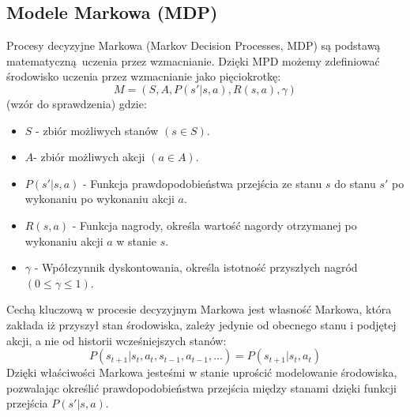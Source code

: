 \documentclass[a4paper, 10pt]{article}
\begin{document}
    \subsection{Modele Markowa (MDP)}
    Procesy decyzyjne Markowa (Markov Decision Processes, MDP) są podstawą matematyczną uczenia przez wzmacnianie. Dzięki MPD możemy zdefiniować
    środowisko uczenia przez wzmacnianie jako pięciokrotkę:
    \[ M = (S,A, P(s'|s,a), R(s,a), \gamma) \] (wzór do sprawdzenia)
    gdzie:
    \begin{itemize}
        \item \( S \)  - zbiór możliwych stanów \( (s \in S ) \).
        \item \( A \)- zbiór możliwych akcji \( (a \in A ) \).
        \item \( P(s'|s,a) \) - Funkcja prawdopodobieństwa przejścia ze stanu \( s \) do stanu \( s' \) po wykonaniu po wykonaniu akcji \( a \).
        \item \( R(s,a) \) - Funkcja nagrody, określa wartość nagordy otrzymanej po wykonaniu akcji \( a \) w stanie \( s \).
        \item \( \gamma \) - Wpółczynnik dyskontowania, określa istotność przyszłych nagród \( (0 \leq \gamma \leq 1) \).
    \end{itemize}
    Cechą kluczową w procesie decyzyjnym Markowa jest własność Markowa, która zakłada iż przyszył stan środowiska, zależy jedynie od obecnego
    stanu i podjętej akcji, a nie od historii wcześniejszych stanów:
    \[ P(s_{t+1}|s_t,a_t,s_{t-1},a_{t-1},...) = P(s_{t+1}|s_t, a_t) \]
    Dzięki właściwości Markowa jesteśmi w stanie uprościć modelowanie środowiska, pozwalając określić prawdopodobieństwa przejścia między stanami dzięki funkcji przejścia
    \( P(s'|s,a) \).
\end{document}
